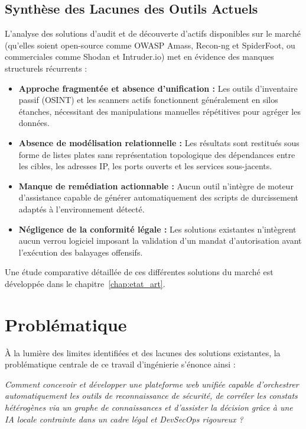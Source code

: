 \subsection{Synth\`ese des Lacunes des Outils Actuels}
\par L'analyse des solutions d'audit et de d\'ecouverte d'actifs disponibles sur le march\'e (qu'elles soient open-source comme OWASP Amass, Recon-ng et SpiderFoot, ou commerciales comme Shodan et Intruder.io) met en \'evidence des manques structurels r\'ecurrents :
\begin{itemize}
    \item \textbf{Approche fragment\'ee et absence d'unification :} Les outils d'inventaire passif (OSINT) et les scanners actifs fonctionnent g\'en\'eralement en silos \'etanches, n\'ecessitant des manipulations manuelles r\'ep\'etitives pour agr\'eger les donn\'ees.
    \item \textbf{Absence de mod\'elisation relationnelle :} Les r\'esultats sont restitu\'es sous forme de listes plates sans repr\'esentation topologique des d\'ependances entre les cibles, les adresses IP, les ports ouverts et les services sous-jacents.
    \item \textbf{Manque de rem\'ediation actionnable :} Aucun outil n'int\`egre de moteur d'assistance capable de g\'en\'erer automatiquement des scripts de durcissement adapt\'es \`a l'environnement d\'etect\'e.
    \item \textbf{N\'egligence de la conformit\'e l\'egale :} Les solutions existantes n'int\`egrent aucun verrou logiciel imposant la validation d'un mandat d'autorisation avant l'ex\'ecution des balayages offensifs.
\end{itemize}
\par Une \'etude comparative d\'etaill\'ee de ces diff\'erentes solutions du march\'e est d\'evelopp\'ee dans le chapitre~\ref{chap:etat_art}.

\section{Probl\'ematique}
\par \`A la lumi\`ere des limites identifi\'ees et des lacunes des solutions existantes, la probl\'ematique centrale de ce travail d'ing\'enierie s'\'enonce ainsi :
\begin{center}
\textit{\og Comment concevoir et d\'evelopper une plateforme web unifi\'ee capable d'orchestrer automatiquement les outils de reconnaissance de s\'ecurit\'e, de corr\'eler les constats h\'et\'erog\`enes via un graphe de connaissances et d'assister la d\'ecision gr\^ace \`a une IA locale contrainte dans un cadre l\'egal et DevSecOps rigoureux ? \fg}
\end{center}

